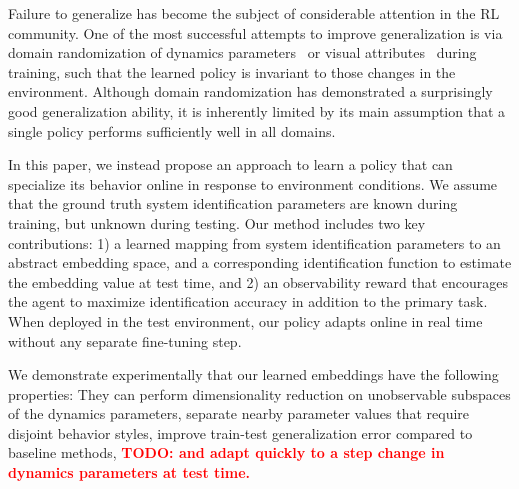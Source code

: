 \documentclass{article}
\newcommand{\TODO}[1]{\textcolor{red}{\textbf{TODO: #1}}}
\begin{document}
Failure to generalize has become the subject of considerable attention in the RL community.
One of the most successful attempts to improve generalization is via domain randomization of dynamics parameters~\citep{antonova-pivoting-corr17, zhu-RL-IL-diverse}
or visual attributes~\citep{sadeghi-cad2rl-rss17,tobin-domainrand-arxiv17,james-domain-xfer} during training, such that the learned policy is invariant to those changes in the environment.
Although domain randomization has demonstrated a surprisingly good generalization ability,
it is inherently limited by its main assumption that a single policy performs sufficiently well in all domains.

In this paper, we instead propose an approach to learn a policy that can specialize its behavior online in response to environment conditions.
We assume that the ground truth system identification parameters are known during training, but unknown during testing.
Our method includes two key contributions:
1) a learned mapping from system identification parameters to an abstract embedding space,
and a corresponding identification function to estimate the embedding value at test time,
and
2) an observability reward that encourages the agent to maximize identification accuracy in addition to the primary task.
When deployed in the test environment, our policy adapts online in real time without any separate fine-tuning step.

We demonstrate experimentally that our learned embeddings have the following properties:
They can perform dimensionality reduction on unobservable subspaces of the dynamics parameters,
separate nearby parameter values that require disjoint behavior styles,
improve train-test generalization error compared to baseline methods,
\TODO{and adapt quickly to a step change in dynamics parameters at test time.}
\end{document}
